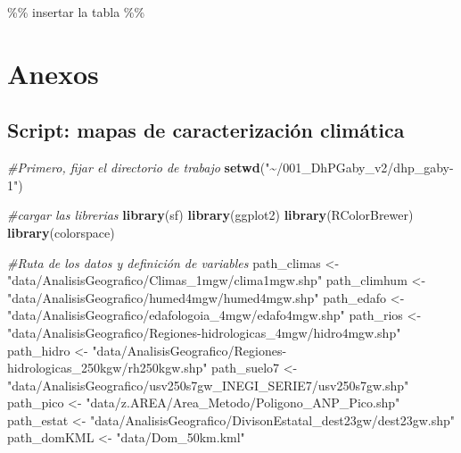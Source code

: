 \documentclass[
  11pt,
  letterpaper,
  DIV=11,
  numbers=noendperiod]{scrartcl}
\newenvironment{Shaded}{\begin{snugshade}}{\end{snugshade}}
\newcommand{\CommentTok}[1]{\textcolor[rgb]{0.56,0.35,0.01}{\textit{#1}}}
\newcommand{\FunctionTok}[1]{\textcolor[rgb]{0.13,0.29,0.53}{\textbf{#1}}}
\newcommand{\NormalTok}[1]{#1}
\newcommand{\OtherTok}[1]{\textcolor[rgb]{0.56,0.35,0.01}{#1}}
\newcommand{\StringTok}[1]{\textcolor[rgb]{0.31,0.60,0.02}{#1}}
\begin{document}
\%\% insertar la tabla \%\%

\section{Anexos}\label{anexos}

\subsection{Script: mapas de caracterización
climática}\label{script-mapas-de-caracterizaciuxf3n-climuxe1tica}

\begin{Shaded}
\begin{Highlighting}[numbers=left,,]
\CommentTok{\#Primero, fijar el directorio de trabajo}
\FunctionTok{setwd}\NormalTok{(}\StringTok{"\textasciitilde{}/001\_DhPGaby\_v2/dhp\_gaby{-}1"}\NormalTok{)}

\CommentTok{\#cargar las librerias}
\FunctionTok{library}\NormalTok{(sf)}
\FunctionTok{library}\NormalTok{(ggplot2)}
\FunctionTok{library}\NormalTok{(RColorBrewer)}
\FunctionTok{library}\NormalTok{(colorspace)}

\CommentTok{\#Ruta de los datos y definición de variables}
\NormalTok{path\_climas }\OtherTok{\textless{}{-}} \StringTok{"data/AnalisisGeografico/Climas\_1mgw/clima1mgw.shp"}
\NormalTok{path\_climhum }\OtherTok{\textless{}{-}} \StringTok{"data/AnalisisGeografico/humed4mgw/humed4mgw.shp"}
\NormalTok{path\_edafo }\OtherTok{\textless{}{-}} \StringTok{"data/AnalisisGeografico/edafologoia\_4mgw/edafo4mgw.shp"}
\NormalTok{path\_rios }\OtherTok{\textless{}{-}} \StringTok{"data/AnalisisGeografico/Regiones{-}hidrologicas\_4mgw/hidro4mgw.shp"}
\NormalTok{path\_hidro }\OtherTok{\textless{}{-}} \StringTok{"data/AnalisisGeografico/Regiones{-}hidrologicas\_250kgw/rh250kgw.shp"}
\NormalTok{path\_suelo7 }\OtherTok{\textless{}{-}} \StringTok{"data/AnalisisGeografico/usv250s7gw\_INEGI\_SERIE7/usv250s7gw.shp"}
\NormalTok{path\_pico }\OtherTok{\textless{}{-}} \StringTok{"data/z.AREA/Area\_Metodo/Poligono\_ANP\_Pico.shp"}
\NormalTok{path\_estat }\OtherTok{\textless{}{-}} \StringTok{"data/AnalisisGeografico/DivisonEstatal\_dest23gw/dest23gw.shp"}
\NormalTok{path\_domKML }\OtherTok{\textless{}{-}} \StringTok{"data/Dom\_50km.kml"}


\end{Highlighting}
\end{Shaded}
\end{document}
